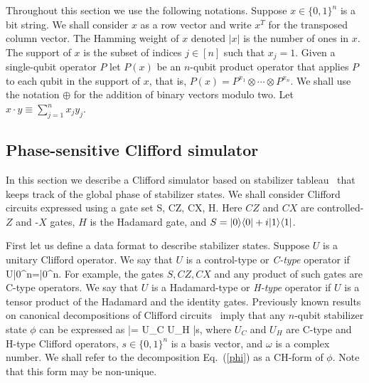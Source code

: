 
Throughout this section we use the following notations.
Suppose $x\in  \{0,1\}^n$ is a bit string.
We shall consider $x$  as a row vector  and write $x^T$ for the transposed column vector. 
The Hamming weight of $x$ denoted $|x|$ is the number of ones in $x$.
The support of $x$  is the subset of indices $j\in [n]$ such that $x_j=1$.
Given a single-qubit operator
$P$  let $P(x)$ be an $n$-qubit product operator
that applies $P$ to each qubit in the support of $x$, that is, 
$P(x)=P^{x_1}\otimes \cdots \otimes P^{x_n}$.
We shall use the notation $\oplus$ for the addition of binary vectors modulo two.
Let  $x\cdot y\equiv \sum_{j=1}^n x_jy_j$.


\subsection{Phase-sensitive Clifford simulator}
\label{clifford_sim}
\newcommand{\modtwo}{\; (\mathrm{mod}\, 2)}
In this section we describe a  Clifford simulator based on stabilizer tableau~\cite{aaronson04improved}  that keeps track of the global phase of stabilizer states. 
We shall consider Clifford circuits expressed using a gate set
\be
\label{CLgates}
S, \quad CZ, \quad CX,
\quad H.
\ee
Here $CZ$ and $CX$ are controlled-$Z$ and -$X$ gates, 
$H$ is the Hadamard gate, and $S=|0\rangle\langle 0|+i|1\rangle\langle 1|$.

First let us define a data format to describe stabilizer states. 
Suppose $U$ is a unitary Clifford operator.
We say that $U$ is a control-type or
{\em C-type} operator
if
\be
\label{Ctype} 
U|0^n\ra=|0^n\ra.
\ee  
For example, the gates $S,CZ,CX$ and any product of such gates are C-type operators.
We say that $U$ is a Hadamard-type or {\em H-type} operator if
$U$ is a tensor product of the Hadamard and the identity gates. 
Previously known results on canonical decompositions of Clifford circuits~\cite{nest2008classical,garcia2012efficient,maslov2017shorter}
imply that any $n$-qubit stabilizer state $\phi$ can be expressed as 
\be
\label{phi}
|\phi\ra = \omega U_C U_H  |s\ra,
\ee
where $U_C$ and $U_H$ are C-type and H-type Clifford operators,
$s\in \{0,1\}^n$ is a basis vector, and $\omega$ is a complex number. 
We shall refer to the decomposition Eq.~(\ref{phi}) as a CH-form of $\phi$.
Note that this form may be non-unique.

